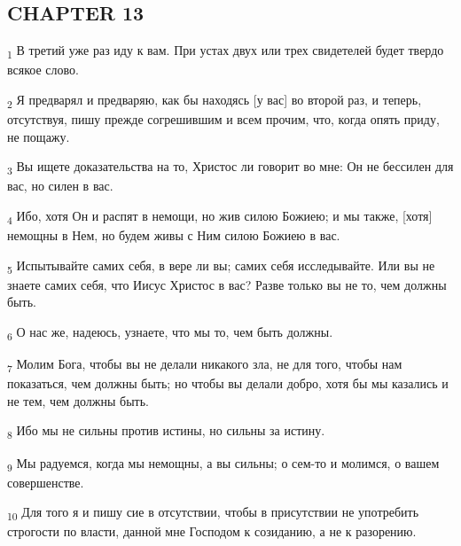 \subsection{CHAPTER 13}
\begin{tcolorbox}
\textsubscript{1} В третий уже раз иду к вам. При устах двух или трех свидетелей будет твердо всякое слово.
\end{tcolorbox}
\begin{tcolorbox}
\textsubscript{2} Я предварял и предваряю, как бы находясь [у вас] во второй раз, и теперь, отсутствуя, пишу прежде согрешившим и всем прочим, что, когда опять приду, не пощажу.
\end{tcolorbox}
\begin{tcolorbox}
\textsubscript{3} Вы ищете доказательства на то, Христос ли говорит во мне: Он не бессилен для вас, но силен в вас.
\end{tcolorbox}
\begin{tcolorbox}
\textsubscript{4} Ибо, хотя Он и распят в немощи, но жив силою Божиею; и мы также, [хотя] немощны в Нем, но будем живы с Ним силою Божиею в вас.
\end{tcolorbox}
\begin{tcolorbox}
\textsubscript{5} Испытывайте самих себя, в вере ли вы; самих себя исследывайте. Или вы не знаете самих себя, что Иисус Христос в вас? Разве только вы не то, чем должны быть.
\end{tcolorbox}
\begin{tcolorbox}
\textsubscript{6} О нас же, надеюсь, узнаете, что мы то, чем быть должны.
\end{tcolorbox}
\begin{tcolorbox}
\textsubscript{7} Молим Бога, чтобы вы не делали никакого зла, не для того, чтобы нам показаться, чем должны быть; но чтобы вы делали добро, хотя бы мы казались и не тем, чем должны быть.
\end{tcolorbox}
\begin{tcolorbox}
\textsubscript{8} Ибо мы не сильны против истины, но сильны за истину.
\end{tcolorbox}
\begin{tcolorbox}
\textsubscript{9} Мы радуемся, когда мы немощны, а вы сильны; о сем-то и молимся, о вашем совершенстве.
\end{tcolorbox}
\begin{tcolorbox}
\textsubscript{10} Для того я и пишу сие в отсутствии, чтобы в присутствии не употребить строгости по власти, данной мне Господом к созиданию, а не к разорению.
\end{tcolorbox}
